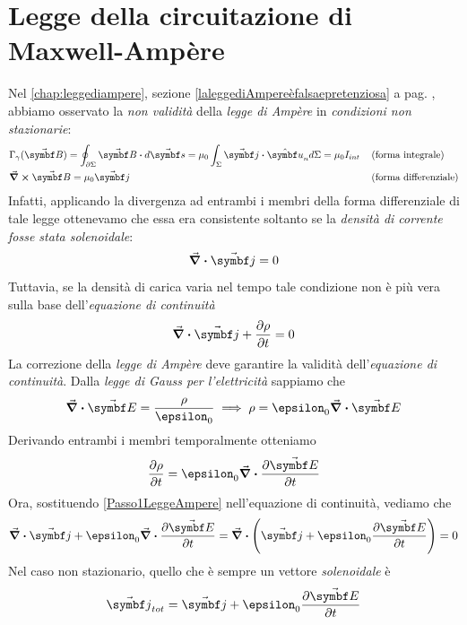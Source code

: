 \section{Legge della circuitazione di Maxwell-Ampère}
Nel \autoref{chap:leggediampere}, sezione \ref{laleggediAmpereèfalsaepretenziosa} a pag. \pageref{laleggediAmpereèfalsaepretenziosa}, abbiamo osservato la \textit{non validità} della \textit{legge di Ampère} in \textit{condizioni non stazionarie}:
\begin{align*}
	&\Gamma_{\gamma}(\vba{B})=\oint_{\partial \Sigma} \vba{B}\vdot d\vba{s}=\mu_0\int_{\Sigma}\vba{j}\vdot\vbh{u}_nd\Sigma=\mu_0 I_{int}	&& \left(\text{forma integrale}\right)\\
	&\curl{\vba{B}}=\mu_0\vba{j}	&& \left(\text{forma differenziale}\right)
\end{align*}
Infatti, applicando la divergenza ad entrambi i membri della forma differenziale di tale legge ottenevamo che essa era consistente soltanto se la \textit{densità di corrente fosse stata solenoidale}:
\begin{equation*}
	\div{\vba{j}}=0
\end{equation*}
Tuttavia, se la densità di carica varia nel tempo tale condizione non è più vera sulla base dell'\textit{equazione di continuità}
\begin{equation*}
	\div{\vba{j}}+\pdv{\rho}{t}=0
\end{equation*}
La correzione della \textit{legge di Ampère} deve garantire la validità dell'\textit{equazione di continuità}.
Dalla \textit{legge di Gauss per l'elettricità} sappiamo che
\begin{equation*}
	\div{\vba{E}}=\frac{\rho}{\epsilon_0}\implies \rho=\epsilon_0\div{\vba{E}}
\end{equation*}
Derivando entrambi i membri temporalmente otteniamo
\begin{equation}
	\pdv{\rho}{t}=\epsilon_0\div{\pdv{\vba{E}}{t}}\label{Passo1LeggeAmpere}
\end{equation}
Ora, sostituendo \eqref{Passo1LeggeAmpere} nell'equazione di continuità, vediamo che
\begin{equation*}
	\div{\vba{j}}+\epsilon_0\div{\pdv{\vba{E}}{t}}=\div{\left(\vba{j}+\epsilon_0\pdv{\vba{E}}{t}\right)}=0
\end{equation*}
Nel caso non stazionario, quello che è sempre un vettore \textit{solenoidale} è
\begin{equation*}
	\vba{j}_{tot}=\vba{j}+\epsilon_0\pdv{\vba{E}}{t}
\end{equation*}
